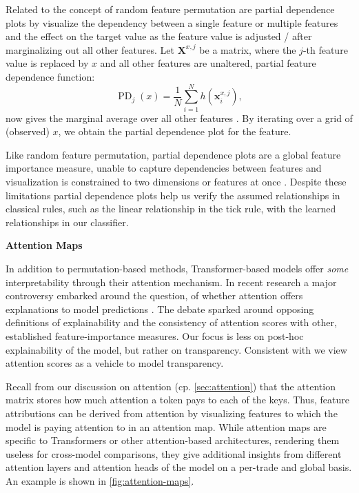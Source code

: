 Related to the concept of random feature permutation are partial dependence plots by \textcite[][26--28]{friedmanGreedyFunctionApproximation2001} visualize the dependency between a single feature or multiple features and the effect on the target value as the feature value is adjusted / after marginalizing out all other features. Let $\mathbf{X}^{x,j}$ be a matrix, where the $j$-th feature value is replaced by $x$ and all other features are unaltered, partial feature dependence function:
\begin{equation}
    \operatorname{PD}_{j}(x) = \frac{1}{N} \sum_{i=1}^{N} h(\mathbf{x}^{x,j}_{i}),
\end{equation}
now gives the marginal average over all other features \autocite[][81]{hookerUnrestrictedPermutationForces2021}. By iterating over a grid of (observed) $x$, we obtain the partial dependence plot for the feature.

Like random feature permutation, partial dependence plots are a global feature importance measure, unable to capture dependencies between features and visualization is constrained to two dimensions or features at once \autocite[][p. 388]{hastietrevorElementsStatisticalLearning2009}. Despite these limitations partial dependence plots help us verify the assumed relationships in classical rules, such as the linear relationship in the tick rule, with the learned relationships in our classifier.


\textbf{Attention Maps}

In addition to permutation-based methods, Transformer-based models offer \emph{some} interpretability through their attention mechanism. In recent research a major controversy embarked around the question, of whether attention offers explanations to model predictions \autocites[cp.][150]{bastingsElephantInterpretabilityRoom2020}[][5--7]{jainAttentionNotExplanation2019}[][9]{wiegreffeAttentionNotNot2019}. The debate sparked around opposing definitions of explainability and the consistency of attention scores with other, established feature-importance measures. Our focus is less on post-hoc explainability of the model, but rather on transparency. Consistent with \textcite[][8]{wiegreffeAttentionNotNot2019} we view attention scores as a vehicle to model transparency.

Recall from our discussion on attention (cp. \cref{sec:attention}) that the attention matrix stores how much attention a token pays to each of the keys. Thus, feature attributions can be derived from attention by visualizing features to which the model is paying attention to in an attention map. While attention maps are specific to Transformers or other attention-based architectures, rendering them useless for cross-model comparisons, they give additional insights from different attention layers and attention heads of the model on a per-trade and global basis. An example is shown in \cref{fig:attention-maps}.

